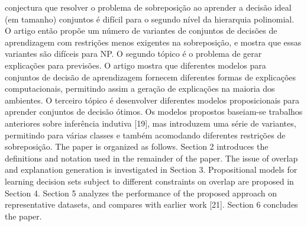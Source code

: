 \documentclass[a4paper, 12 pt]{article}
\begin{document}
conjectura que resolver o problema de sobreposição ao aprender a decisão ideal (em tamanho)
conjuntos é difícil para o segundo nível da hierarquia polinomial. O artigo então propõe um
número de variantes de conjuntos de decisões de aprendizagem com restrições menos exigentes na sobreposição,
e mostra que essas variantes são difíceis para NP. O segundo tópico é o problema
de gerar explicações para previsões. O artigo mostra que diferentes modelos para
conjuntos de decisão de aprendizagem fornecem diferentes formas de explicações computacionais, permitindo assim
a geração de explicações na maioria dos ambientes. O terceiro tópico é desenvolver diferentes
modelos proposicionais para aprender conjuntos de decisão ótimos. Os modelos propostos baseiam-se
trabalhos anteriores sobre inferência indutiva [19], mas introduzem uma série de variantes, permitindo
para várias classes e também acomodando diferentes restrições de sobreposição. 
The paper is organized as follows. Section 2 introduces the definitions and notation
used in the remainder of the paper. The issue of overlap and explanation generation
is investigated in Section 3. Propositional models for learning decision sets subject to
different constraints on overlap are proposed in Section 4. Section 5 analyzes the performance
of the proposed approach on representative datasets, and compares with earlier
work [21]. Section 6 concludes the paper.
\end{document}
